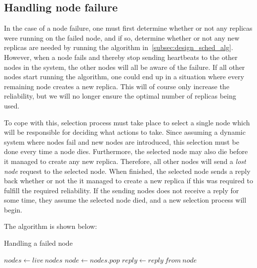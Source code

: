 \documentclass{cslthse-msc}
\begin{document}
\subsection{Handling node failure} \label{subsec:design_handling_failure}
In the case of a node failure, one must first determine whether or not any replicas were running on the failed node, and if so, determine whether or not any new replicas are needed by running the algorithm in~\cref{subsec:design_sched_alg}. However, when a node fails and thereby stop sending heartbeats to the other nodes in the system, the other nodes will all be aware of the failure. If all other nodes start running the algorithm, one could end up in a situation where every remaining node creates a new replica. This will of course only increase the reliability, but we will no longer ensure the optimal number of replicas being used. 

To cope with this, selection process must take place to select a single node which will be responsible for deciding what actions to take. Since assuming a dynamic system where nodes fail and new nodes are introduced, this selection must be done every time a node dies. Furthermore, the selected node may also die before it managed to create any new replica. Therefore, all other nodes will send a \emph{lost node} request to the selected node. When finished, the selected node sends a reply back whether or not the it managed to create a new replica if this was required to fulfill the required reliability. If the sending nodes does not receive a reply for some time, they assume the selected node died, and a new selection process will begin.

The algorithm is shown below: %

\begin{algorithm}\label{alg:node_failure}
	\caption{Handling a failed node}
	\begin{algorithmic}[1]
	\State $nodes\gets live\ nodes$
	\Do
		\State $node\gets nodes.pop$
		\State
		\State $reply\gets reply\ from\ node$
	\end{algorithmic}
\end{algorithm}
\end{document}
